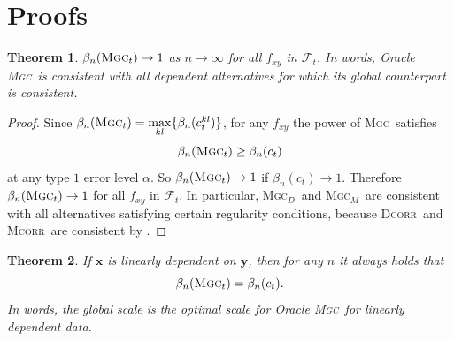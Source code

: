 \documentclass[11pt]{article}
\providecommand{\sct}[1]{{\normalfont\textsc{#1}}}
\providecommand{\mb}[1]{\boldsymbol{#1}}
\providecommand{\mc}[1]{\mathcal{#1}}
\newcommand{\G}{c}
\newcommand{\Mgc}{\sct{Mgc}}
\newcommand{\Mgcd}{\sct{Mgc$_D$}}
\newcommand{\Mgcm}{\sct{Mgc$_M$}}
\newcommand{\Dcorr}{\sct{Dcorr}}
\newcommand{\Mcorr}{\sct{Mcorr}}
\newtheorem{appThm}{Theorem}
\begin{document}

\section{Proofs}
\label{appen:proofs}
\begin{appThm}
$\beta_n(\Mgc_t) \rightarrow 1$ as $n \to \infty$ for all $f_{xy}$ in $\mc{F}_t$.
In words, Oracle \Mgc~is consistent with all dependent alternatives for which its global counterpart is consistent. 
\end{appThm}
\begin{proof}
Since $\beta_n(\Mgc_t)=\underset{kl}{\max}\{\beta_n(\G_t^{kl})\}$, for any $f_{xy}$ the power of \Mgc~satisfies
\begin{equation*}
\beta_n(\Mgc_t) \geq \beta_n(\G_t)
\end{equation*}
at any type $1$ error level $\alpha$. So $\beta_n(\Mgc_t) \rightarrow 1$ if $\beta_n(\G_t) \rightarrow 1$.
% 
Therefore $\beta_n(\Mgc_t) \rightarrow 1$ for all $f_{xy}$ in $\mc{F}_t$. In particular, \Mgcd~and \Mgcm~are consistent with all alternatives satisfying certain regularity conditions, because \Dcorr~and \Mcorr~are consistent by \cite{SzekelyRizzoBakirov2007, SzekelyRizzo2013a}. 
\end{proof}

\begin{appThm}
If $\mb{x}$ is linearly dependent on $\mb{y}$, then for any $n$ it always holds that
\begin{equation}
\beta_n(\Mgc_t) = \beta_n(\G_t).
\end{equation}
In words, the global scale is the optimal scale for Oracle \Mgc~for linearly dependent data.
\end{appThm}
\end{document}

